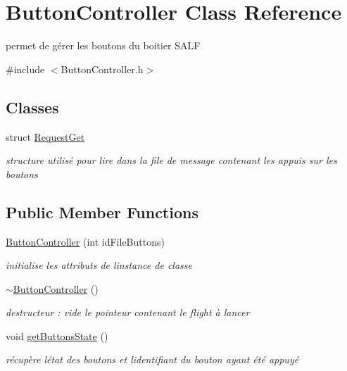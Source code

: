 \hypertarget{class_button_controller}{}\section{Button\+Controller Class Reference}
\label{class_button_controller}


permet de gérer les boutons du boitier S\+A\+LF  




{\ttfamily \#include $<$Button\+Controller.\+h$>$}

\subsection*{Classes}
\begin{DoxyCompactItemize}
\item 
struct \hyperlink{struct_button_controller_1_1_request_get}{Request\+Get}
\begin{DoxyCompactList}\small\item\em structure utilisé pour lire dans la file de message contenant les appuis sur les boutons \end{DoxyCompactList}\end{DoxyCompactItemize}
\subsection*{Public Member Functions}
\begin{DoxyCompactItemize}
\item 
\hyperlink{class_button_controller_a59f3c5f3163bc05c9a7621455d6ed409}{Button\+Controller} (int id\+File\+Buttons)
\begin{DoxyCompactList}\small\item\em initialise les attributs de l\textquotesingle{}instance de classe \end{DoxyCompactList}\item 
\hyperlink{class_button_controller_a0fd052bda98ee3121d39820894abbe2c}{$\sim$\+Button\+Controller} ()
\begin{DoxyCompactList}\small\item\em destructeur \+: vide le pointeur contenant le flight à lancer \end{DoxyCompactList}\item 
void \hyperlink{class_button_controller_a3c26811d268e3c4c16df241775dff030}{get\+Buttons\+State} ()
\begin{DoxyCompactList}\small\item\em récupère l\textquotesingle{}état des boutons et l\textquotesingle{}identifiant du bouton ayant été appuyé \end{DoxyCompactList}\end{DoxyCompactItemize}


